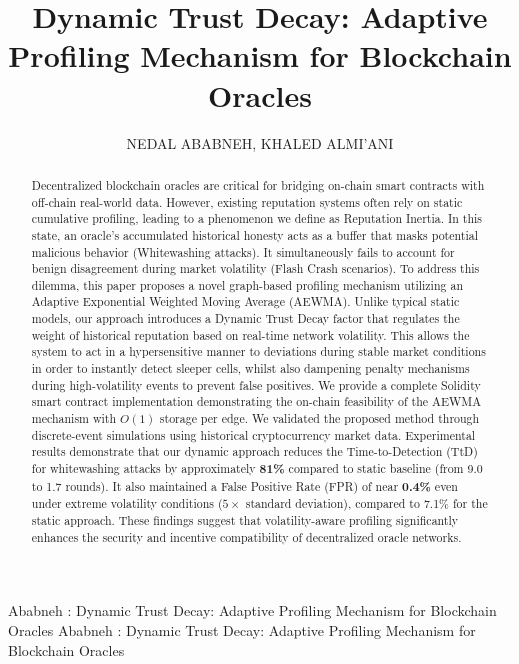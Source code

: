 \documentclass{ieeeaccess}
\begin{document}

\title{Dynamic Trust Decay: Adaptive Profiling Mechanism for Blockchain Oracles}
\author{\uppercase{Nedal Ababneh},
\uppercase{Khaled Almi'ani}
}
\address[1]{College of Computing and Intelligent Systems, University of Khorfakkan, Sharjah, UAE (e-mail: Nedal.Ababneh@ukf.ac.ae)}
\address[2]{College of Computing and Intelligent Systems, University of Khorfakkan, Sharjah, UAE (e-mail: k.almiani@ukf.ac.ae)}

\markboth
{Ababneh \headeretal: Dynamic Trust Decay: Adaptive Profiling Mechanism for Blockchain Oracles}
{Ababneh \headeretal: Dynamic Trust Decay: Adaptive Profiling Mechanism for Blockchain Oracles}


\begin{abstract}
Decentralized blockchain oracles are critical for bridging on-chain smart contracts with off-chain real-world data. However, existing reputation systems often rely on static cumulative profiling, leading to a phenomenon we define as Reputation Inertia. In this state, an oracle's accumulated historical honesty acts as a buffer that masks potential malicious behavior (Whitewashing attacks). It simultaneously fails to account for benign disagreement during market volatility (Flash Crash scenarios). To address this dilemma, this paper proposes a novel graph-based profiling mechanism utilizing an Adaptive Exponential Weighted Moving Average (AEWMA). Unlike typical static models, our approach introduces a Dynamic Trust Decay factor that regulates the weight of historical reputation based on real-time network volatility. This allows the system to act in a hypersensitive manner to deviations during stable market conditions in order to instantly detect sleeper cells, whilst also dampening penalty mechanisms during high-volatility events to prevent false positives. We provide a complete Solidity smart contract implementation demonstrating the on-chain feasibility of the AEWMA mechanism with $O(1)$ storage per edge. We validated the proposed method through discrete-event simulations using historical cryptocurrency market data. Experimental results demonstrate that our dynamic approach reduces the Time-to-Detection (TtD) for whitewashing attacks by approximately \textbf{81\%} compared to static baseline (from 9.0 to 1.7 rounds). It also maintained a False Positive Rate (FPR) of near \textbf{0.4\%} even under extreme volatility conditions ($5\times$ standard deviation), compared to 7.1\% for the static approach. These findings suggest that volatility-aware profiling significantly enhances the security and incentive compatibility of decentralized oracle networks.
\end{abstract}
\end{document}
